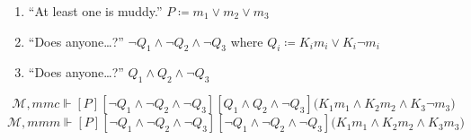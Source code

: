 \documentclass[UTF8,11pt,colorlinks,compress,openany]{beamer}%
\begin{document}
\begin{frame}
\begin{columns}
{\begin{minipage}{\textwidth}
\end{minipage}}
\end{columns}
\begin{enumerate}
	\item ``At least one is muddy.'' $P\coloneqq m_1\vee m_2\vee m_3$
	\item ``Does anyone\dots?'' $\neg Q_1\wedge\neg Q_2\wedge\neg Q_3$ where $Q_i\coloneqq K_im_i\vee K_i\neg m_i$
	\item ``Does anyone\dots?'' $Q_1\wedge Q_2\wedge\neg Q_3$
\end{enumerate}
\[\mathcal{M},mmc\Vdash[P][\neg Q_1\wedge\neg Q_2\wedge\neg Q_3][Q_1\wedge Q_2\wedge\neg Q_3]\big(K_1m_1\wedge K_2m_2\wedge K_3\neg m_3\big)\]
\[\mathcal{M},mmm\Vdash[P][\neg Q_1\wedge\neg Q_2\wedge\neg Q_3][\neg Q_1\wedge\neg Q_2\wedge\neg Q_3]\big(K_1m_1\wedge K_2m_2\wedge K_3m_3\big)\]
\end{frame}
\end{document}
